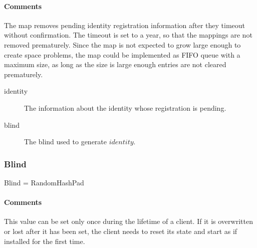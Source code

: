 \documentclass[a4paper,10pt]{article}
\begin{document}
\begin{inparaitem}[ ]
 \item \unique
 \item \secure
 \item \persistent
\end{inparaitem}

\paragraph*{Comments}
The map removes pending identity registration information after they timeout without confirmation. The timeout is set to a year, so that the mappings are not removed prematurely. 
Since the map is not expected to grow large enough to create space problems, the map could be implemented as FIFO queue with a maximum size, as long as the size is large enough 
entries are not cleared prematurely.

\SpecialItem
\begin{description}
 \item[identity] The information about the identity whose registration is pending.
 \item[blind] The blind used to generate $identity$.
\end{description}

\subsubsection{Blind}

\begin{verbbox}
Blind = RandomHashPad
\end{verbbox}
\begin{center}
\theverbbox
\end{center}

\begin{inparaitem}[ ]
 \item \unique
 \item \secure
 \item \persistent
\end{inparaitem}

\paragraph*{Comments}
This value can be set only once during the lifetime of a client. If it is overwritten or lost after it has been set, the client needs to reset its state and start as if installed 
for the first time.
\end{document}
